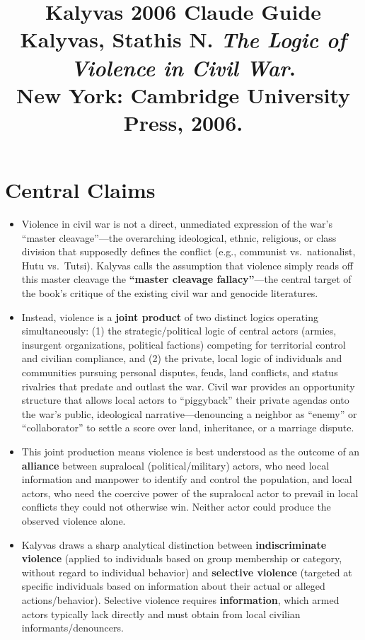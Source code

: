 \documentclass[12pt]{article}
\title{\textbf{Kalyvas 2006 Claude Guide}\\
\large Kalyvas, Stathis N. \textit{The Logic of Violence in Civil War}.\\
New York: Cambridge University Press, 2006.}
\author{}
\date{}
\begin{document}
\maketitle
\tableofcontents
\newpage

\section{Central Claims}

\begin{itemize}[leftmargin=*, itemsep=4pt]
    \item Violence in civil war is not a direct, unmediated expression of the war's ``master cleavage''---the overarching ideological, ethnic, religious, or class division that supposedly defines the conflict (e.g., communist vs.\ nationalist, Hutu vs.\ Tutsi). Kalyvas calls the assumption that violence simply reads off this master cleavage the \textbf{``master cleavage fallacy''}---the central target of the book's critique of the existing civil war and genocide literatures.
    \item Instead, violence is a \textbf{joint product} of two distinct logics operating simultaneously: (1) the strategic/political logic of central actors (armies, insurgent organizations, political factions) competing for territorial control and civilian compliance, and (2) the private, local logic of individuals and communities pursuing personal disputes, feuds, land conflicts, and status rivalries that predate and outlast the war. Civil war provides an opportunity structure that allows local actors to ``piggyback'' their private agendas onto the war's public, ideological narrative---denouncing a neighbor as ``enemy'' or ``collaborator'' to settle a score over land, inheritance, or a marriage dispute.
    \item This joint production means violence is best understood as the outcome of an \textbf{alliance} between supralocal (political/military) actors, who need local information and manpower to identify and control the population, and local actors, who need the coercive power of the supralocal actor to prevail in local conflicts they could not otherwise win. Neither actor could produce the observed violence alone.
    \item Kalyvas draws a sharp analytical distinction between \textbf{indiscriminate violence} (applied to individuals based on group membership or category, without regard to individual behavior) and \textbf{selective violence} (targeted at specific individuals based on information about their actual or alleged actions/behavior). Selective violence requires \textbf{information}, which armed actors typically lack directly and must obtain from local civilian informants/denouncers.

\end{itemize}
\end{document}
